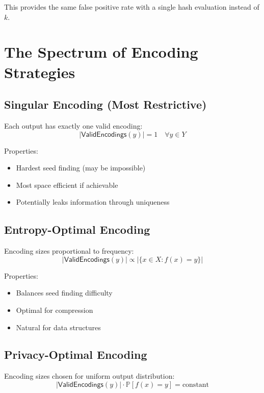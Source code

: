 \documentclass[11pt,final,hidelinks]{article}
\newcommand{\ValidEnc}[1]{\mathsf{ValidEncodings}(#1)}
\newcommand{\Prob}[1]{\mathbb{P}[#1]}
\newcommand{\Card}[1]{|#1|}
\begin{document}
This provides the same false positive rate with a single hash evaluation instead of $k$.

\section{The Spectrum of Encoding Strategies}

\subsection{Singular Encoding (Most Restrictive)}

Each output has exactly one valid encoding:
\begin{equation}
\Card{\ValidEnc{y}} = 1 \quad \forall y \in Y
\end{equation}

Properties:
\begin{itemize}
    \item Hardest seed finding (may be impossible)
    \item Most space efficient if achievable
    \item Potentially leaks information through uniqueness
\end{itemize}

\subsection{Entropy-Optimal Encoding}

Encoding sizes proportional to frequency:
\begin{equation}
\Card{\ValidEnc{y}} \propto \Card{\{x \in X : f(x) = y\}}
\end{equation}

Properties:
\begin{itemize}
    \item Balances seed finding difficulty
    \item Optimal for compression
    \item Natural for data structures
\end{itemize}

\subsection{Privacy-Optimal Encoding}

Encoding sizes chosen for uniform output distribution:
\begin{equation}
\Card{\ValidEnc{y}} \cdot \Prob{f(x) = y} = \text{constant}
\end{equation}
\end{document}
